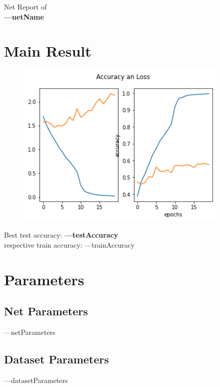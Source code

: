 \documentclass[12pt]{article}
\begin{document}
\begin{center}
    \Large{Net Report of  \\
    \textbf{---netName}}
\end{center}

\section{Main Result}
\begin{figure}[H]
    \centering
    \includegraphics[width = 4in]{../src/acc_plot.png}
\end{figure}
\begin{center}
    \large {Best test accuracy: \textbf{---testAccuracy}} \\
    \large {respective train accuracy: ---trainAccuracy} \\
\end{center}
\section{Parameters}
\subsection{Net Parameters}

\begin{table}[H]
    \centering
    ---netParameters
\end{table}
    
    
\subsection{Dataset Parameters}
\begin{table}[H]
    \centering
    ---datasetParameters
\end{table}
\end{document}

